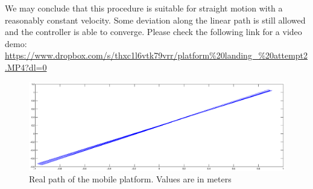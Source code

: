 \noindent
We may conclude that this procedure is suitable for straight motion with a reasonably constant velocity. Some deviation along the linear path is still allowed and the controller is able to converge. Please check the following link for a video demo: \url{https://www.dropbox.com/s/thxc1l6vtk79vrr/platform%20landing_%20attempt2.MP4?dl=0}


\begin{figure}[h]
    \centering
      \includegraphics[width = \textwidth]{platform.eps}
       \caption{Real path of the mobile platform. Values are in meters }
      \label{figure:path}
\end{figure}
